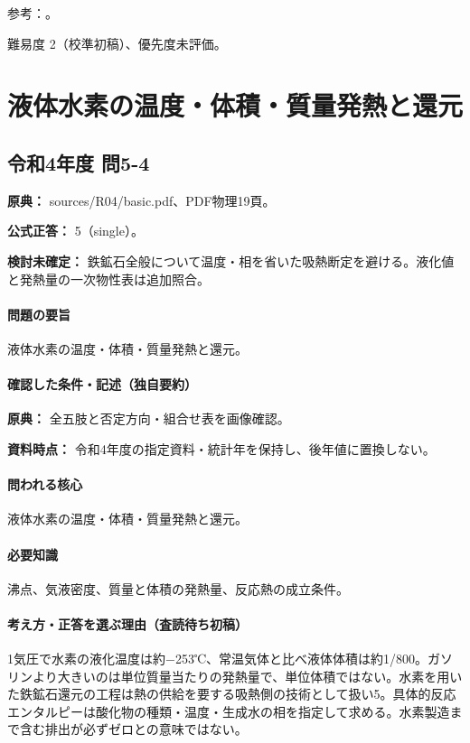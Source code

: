 \par 参考：\cite{env60_house2022}。

\par 難易度 2（校準初稿）、優先度未評価。

\section{液体水素の温度・体積・質量発熱と還元}

\subsection{令和4年度 問5-4}
\label{q:r04-reg-basic-5-4}

\noindent\textbf{原典：} sources/R04/basic.pdf、PDF物理19頁。

\textbf{公式正答：} 5（single）。

\par\textbf{検討未確定：} 鉄鉱石全般について温度・相を省いた吸熱断定を避ける。液化値と発熱量の一次物性表は追加照合。

\paragraph{問題の要旨} 液体水素の温度・体積・質量発熱と還元。

\paragraph{確認した条件・記述（独自要約）}\mbox{}\par

\noindent\textbf{原典：} 全五肢と否定方向・組合せ表を画像確認。\par

\noindent\textbf{資料時点：} 令和4年度の指定資料・統計年を保持し、後年値に置換しない。\par

\paragraph{問われる核心} 液体水素の温度・体積・質量発熱と還元。

\paragraph{必要知識} 沸点、気液密度、質量と体積の発熱量、反応熱の成立条件。

\paragraph{考え方・正答を選ぶ理由（査読待ち初稿）} 1気圧で水素の液化温度は約−253℃、常温気体と比べ液体体積は約1/800。ガソリンより大きいのは単位質量当たりの発熱量で、単位体積ではない。水素を用いた鉄鉱石還元の工程は熱の供給を要する吸熱側の技術として扱い5。具体的反応エンタルピーは酸化物の種類・温度・生成水の相を指定して求める。水素製造まで含む排出が必ずゼロとの意味ではない。


